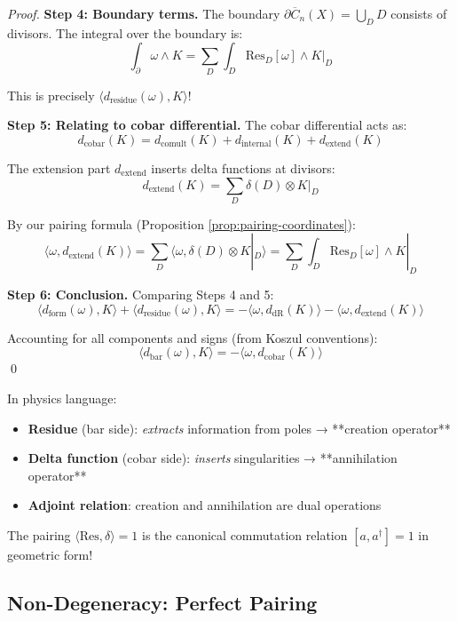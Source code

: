 \begin{proof}
\textbf{Step 4: Boundary terms.}
The boundary $\partial \overline{C}_n(X) = \bigcup_D D$ consists of divisors. The integral
over the boundary is:
$$\int_{\partial} \omega \wedge K = \sum_D \int_D \text{Res}_D[\omega] \wedge K|_D$$

This is precisely $\langle d_{\text{residue}}(\omega), K \rangle$!

\textbf{Step 5: Relating to cobar differential.}
The cobar differential acts as:
$$d_{\text{cobar}}(K) = d_{\text{comult}}(K) + d_{\text{internal}}(K) + d_{\text{extend}}(K)$$

The extension part $d_{\text{extend}}$ inserts delta functions at divisors:
$$d_{\text{extend}}(K) = \sum_D \delta(D) \otimes K|_D$$

By our pairing formula (Proposition \ref{prop:pairing-coordinates}):
$$\langle \omega, d_{\text{extend}}(K) \rangle = \sum_D \langle \omega, \delta(D) \otimes K|_D \rangle
= \sum_D \int_D \text{Res}_D[\omega] \wedge K|_D$$

\textbf{Step 6: Conclusion.}
Comparing Steps 4 and 5:
$$\langle d_{\text{form}}(\omega), K \rangle + \langle d_{\text{residue}}(\omega), K \rangle
= -\langle \omega, d_{\text{dR}}(K) \rangle - \langle \omega, d_{\text{extend}}(K) \rangle$$

Accounting for all components and signs (from Koszul conventions):
$$\langle d_{\text{bar}}(\omega), K \rangle = -\langle \omega, d_{\text{cobar}}(K) \rangle$$
\qed
\end{proof}

\begin{remark}
In physics language:
\begin{itemize}
\item \textbf{Residue} (bar side): \emph{extracts} information from poles → **creation operator**
\item \textbf{Delta function} (cobar side): \emph{inserts} singularities → **annihilation operator**
\item \textbf{Adjoint relation}: creation and annihilation are dual operations
\end{itemize}

The pairing $\langle \text{Res}, \delta \rangle = 1$ is the canonical commutation relation
$[a, a^\dagger] = 1$ in geometric form!
\end{remark}

\subsection{Non-Degeneracy: Perfect Pairing}

